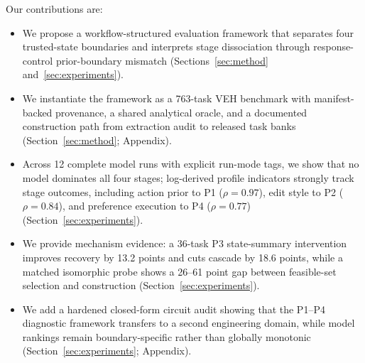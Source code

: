Our contributions are:
\begin{itemize}[leftmargin=5mm,itemsep=1mm,topsep=1mm]
    \item We propose a workflow-structured evaluation framework that separates four trusted-state boundaries and interprets stage dissociation through response-control prior-boundary mismatch (Sections~\ref{sec:method} and~\ref{sec:experiments}).
    \item We instantiate the framework as a 763-task VEH benchmark with manifest-backed provenance, a shared analytical oracle, and a documented construction path from extraction audit to released task banks (Section~\ref{sec:method}; Appendix).
    \item Across 12 complete model runs with explicit run-mode tags, we show that no model dominates all four stages; log-derived profile indicators strongly track stage outcomes, including action prior to P1 ($\rho=0.97$), edit style to P2 ($\rho=0.84$), and preference execution to P4 ($\rho=0.77$) (Section~\ref{sec:experiments}).
    \item We provide mechanism evidence: a 36-task P3 state-summary intervention improves recovery by 13.2 points and cuts cascade by 18.6 points, while a matched isomorphic probe shows a 26--61 point gap between feasible-set selection and construction (Section~\ref{sec:experiments}).
    \item We add a hardened closed-form circuit audit showing that the P1--P4 diagnostic framework transfers to a second engineering domain, while model rankings remain boundary-specific rather than globally monotonic (Section~\ref{sec:experiments}; Appendix).
\end{itemize}
